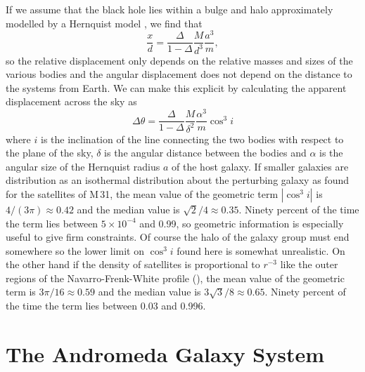 \documentclass[useAMS,usenatbib]{mn2e}
\begin{document}
If we assume that the black hole lies within a bulge and
halo approximately modelled by a Hernquist model \citep[as
  in][]{1997ApJ...487..153V}, we find that
\begin{equation}
  \frac{x}{d} = 
\frac{\Delta}{1-\Delta} \frac{M}{d^3} \frac{a^3}{m},
  \label{eq:13}
\end{equation}
so the relative displacement only depends on the relative masses and
sizes of the various bodies and the angular displacement does not
depend on the distance to the systems from Earth.  We can make this
explicit by calculating the apparent displacement across the sky as
\begin{equation}
  \Delta \theta = \frac{\Delta}{1-\Delta} \frac{M}{\delta^2} \frac{\alpha^3}{m} \cos^3 i
\end{equation}
where $i$ is the inclination of the line connecting the two bodies
with respect to the plane of the sky, $\delta$ is the angular distance
between the bodies and $\alpha$ is the angular size of the Hernquist
radius $a$ of the host galaxy.  If smaller galaxies are distribution
as an isothermal distribution about the perturbing galaxy as
\citet{2006AJ....131.1405K} found for the satellites of M\,31, the
mean value of the geometric term $|\cos^3i|$ is $4/(3\pi) \approx
0.42$ and the median value is $\sqrt{2}/4\approx 0.35$.  Ninety
percent of the time the term lies between $5\times 10^{-4}$ and 0.99,
so geometric information is especially useful to give firm
constraints.  Of course the halo of the galaxy group must end
somewhere so the lower limit on $\cos^3 i$ found here is somewhat
unrealistic.  On the other hand if the density of satellites is
proportional to $r^{-3}$ like the outer regions of the
Navarro-Frenk-White profile (\citeyear{1996ApJ...462..563N}), the mean
value of the geometric term is $3\pi/16 \approx 0.59$ and the median
value is $3\sqrt{3}/8 \approx 0.65$.  Ninety percent of the time the
term lies between 0.03 and 0.996.

\section{The Andromeda Galaxy System}
\end{document}
